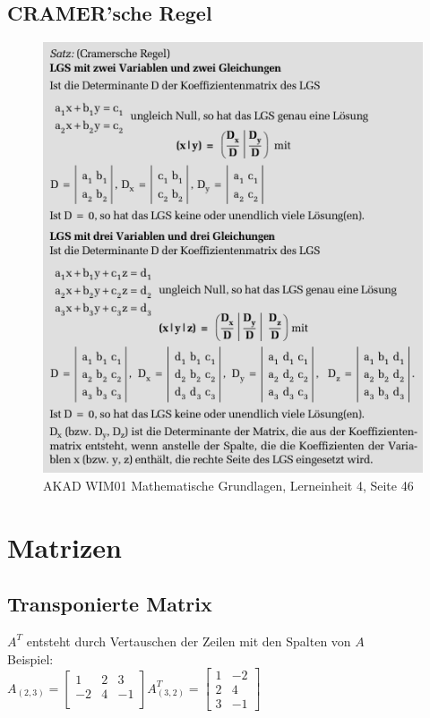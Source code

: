 \documentclass[a4paper,12pt]{scrartcl}
\begin{document}
\subsection{CRAMER'sche Regel}
\begin{figure}[ht]
	\centering
  \includegraphics[width=1.0\textwidth]{wim01-zusammenfassung_cramersche_regel.png}
	\caption{AKAD WIM01 Mathematische Grundlagen, Lerneinheit 4, Seite 46}
	\label{fig01}
\end{figure}


\section{Matrizen}
\subsection{Transponierte Matrix}
$A^T$ entsteht durch Vertauschen der Zeilen mit den Spalten von $A$\\

Beispiel: \\
$A_{(2,3)} = 
\begin{bmatrix}
 1 & 2 & 3\\
 -2 & 4 & -1 \\
\end{bmatrix}
A_{(3,2)}^T = 
\begin{bmatrix}
 1 & -2\\
 2 & 4\\
 3 & -1
\end{bmatrix}
$
\end{document}
